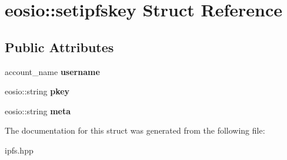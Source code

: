 \hypertarget{structeosio_1_1setipfskey}{}\section{eosio\+:\+:setipfskey Struct Reference}
\label{structeosio_1_1setipfskey}
\subsection*{Public Attributes}
\begin{DoxyCompactItemize}
\item 
\mbox{\label{structeosio_1_1setipfskey_a5dd597ceeec86c0e621b1ad3a1e5acb2}} 
account\+\_\+name {\bfseries username}
\item 
\mbox{\label{structeosio_1_1setipfskey_ab64666a5bf6d202a41fcfeb790582e43}} 
eosio\+::string {\bfseries pkey}
\item 
\mbox{\label{structeosio_1_1setipfskey_a5997bf741cf2de414f4fd95e30e1856e}} 
eosio\+::string {\bfseries meta}
\end{DoxyCompactItemize}


The documentation for this struct was generated from the following file\+:\begin{DoxyCompactItemize}
\item 
ipfs.\+hpp\end{DoxyCompactItemize}
